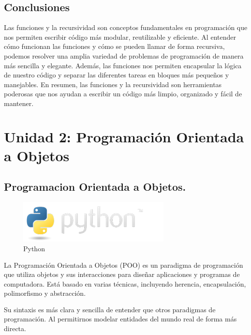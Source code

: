 \documentclass[
  a4paper,
  DIV=11,
  numbers=noendperiod,
  onepage,
  openany]{scrreprt}
\begin{document}
\chapter{Conclusiones}\label{conclusiones-3}

Las funciones y la recursividad son conceptos fundamentales en
programación que nos permiten escribir código más modular, reutilizable
y eficiente. Al entender cómo funcionan las funciones y cómo se pueden
llamar de forma recursiva, podemos resolver una amplia variedad de
problemas de programación de manera más sencilla y elegante. Además, las
funciones nos permiten encapsular la lógica de nuestro código y separar
las diferentes tareas en bloques más pequeños y manejables. En resumen,
las funciones y la recursividad son herramientas poderosas que nos
ayudan a escribir un código más limpio, organizado y fácil de mantener.

\part{Unidad 2: Programación Orientada a Objetos}

\chapter{Programacion Orientada a
Objetos.}\label{programacion-orientada-a-objetos.}

\begin{figure}[H]

{\centering \includegraphics{index_files/mediabag/python-logo.png}

}

\caption{Python}

\end{figure}%

La Programación Orientada a Objetos (POO) es un paradigma de
programación que utiliza objetos y sus interacciones para diseñar
aplicaciones y programas de computadora. Está basado en varias técnicas,
incluyendo herencia, encapsulación, polimorfismo y abstracción.

Su sintaxis es más clara y sencilla de entender que otros paradigmas de
programación. Al permitirnos modelar entidades del mundo real de forma
más directa.
\end{document}
